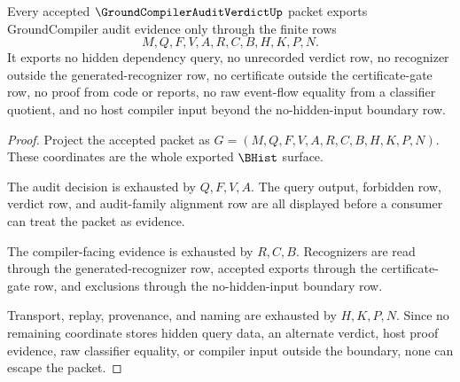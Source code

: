 \begin{theorem}
\label{thm:groundcompiler-audit-verdict-nonescape}
Every accepted $\GroundCompilerAuditVerdictUp$ packet exports GroundCompiler audit evidence only through the finite rows
$$
M,Q,F,V,A,R,C,B,H,K,P,N.
$$
It exports no hidden dependency query, no unrecorded verdict row, no recognizer outside the generated-recognizer row, no certificate outside the certificate-gate row, no proof from code or reports, no raw event-flow equality from a classifier quotient, and no host compiler input beyond the no-hidden-input boundary row.
\end{theorem}
\begin{proof}
Project the accepted packet as $G=(M,Q,F,V,A,R,C,B,H,K,P,N)$. These coordinates are the whole exported $\BHist$ surface.

The audit decision is exhausted by $Q,F,V,A$. The query output, forbidden row, verdict row, and audit-family alignment row are all displayed before a consumer can treat the packet as evidence.

The compiler-facing evidence is exhausted by $R,C,B$. Recognizers are read through the generated-recognizer row, accepted exports through the certificate-gate row, and exclusions through the no-hidden-input boundary row.

Transport, replay, provenance, and naming are exhausted by $H,K,P,N$. Since no remaining coordinate stores hidden query data, an alternate verdict, host proof evidence, raw classifier equality, or compiler input outside the boundary, none can escape the packet.
\end{proof}

